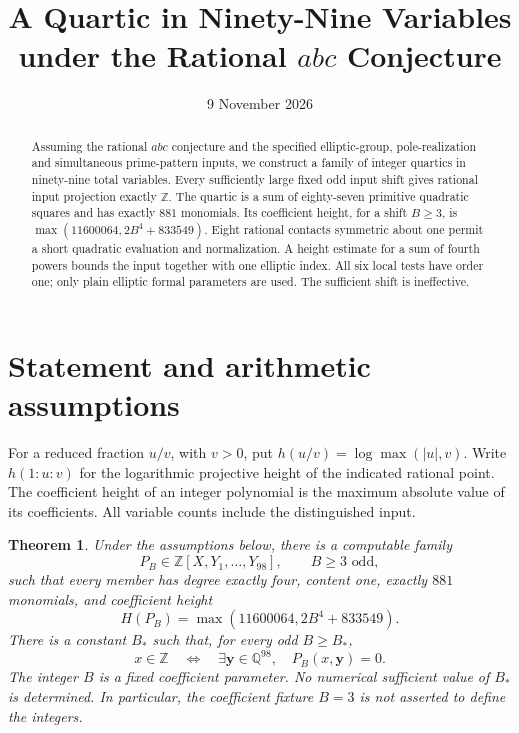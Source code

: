 \documentclass[11pt,a4paper]{article}
\title{A Quartic in Ninety-Nine Variables under the Rational $abc$ Conjecture}
\author{}\date{9 November 2026}
\newtheorem{theorem}{Theorem}[section]
\newcommand{\Q}{\mathbb Q}\newcommand{\Z}{\mathbb Z}
\begin{document}
\maketitle
\begin{abstract}
Assuming the rational $abc$ conjecture and the specified elliptic-group,
pole-realization and simultaneous prime-pattern inputs, we construct a
family of integer quartics in ninety-nine total variables. Every
sufficiently large fixed odd input shift gives rational input projection
exactly $\Z$. The quartic is a sum of eighty-seven primitive quadratic
squares and has exactly $881$ monomials. Its coefficient height, for a
shift $B\ge3$, is $\max(11600064,2B^4+833549)$. Eight rational contacts
symmetric about one permit a short quadratic evaluation and normalization.
A height estimate for a sum of fourth powers bounds the input together
with one elliptic index. All six local tests have order one; only plain
elliptic formal parameters are used. The sufficient shift is ineffective.
\end{abstract}

\section{Statement and arithmetic assumptions}

For a reduced fraction $u/v$, with $v>0$, put
$h(u/v)=\log\max(|u|,v)$. Write $h(1:u:v)$ for the logarithmic
projective height of the indicated rational point. The coefficient height
of an integer polynomial is the maximum absolute value of its coefficients.
All variable counts include the distinguished input.

\begin{theorem}\label{thm:main}
Under the assumptions below, there is a computable family
\[
 P_B\in\Z[X,Y_1,\ldots,Y_{98}],\qquad B\ge3\text{ odd},
\]
such that every member has degree exactly four, content one, exactly
$881$ monomials, and coefficient height
\[
 H(P_B)=\max(11600064,2B^4+833549).
\]
There is a constant $B_*$ such that, for every odd $B\ge B_*$,
\[
 x\in\Z\quad\Longleftrightarrow\quad
 \exists\boldsymbol y\in\Q^{98},\quad P_B(x,\boldsymbol y)=0.
\]
The integer $B$ is a fixed coefficient parameter. No numerical sufficient
value of $B_*$ is determined. In particular, the coefficient fixture
$B=3$ is not asserted to define the integers.
\end{theorem}
\end{document}
